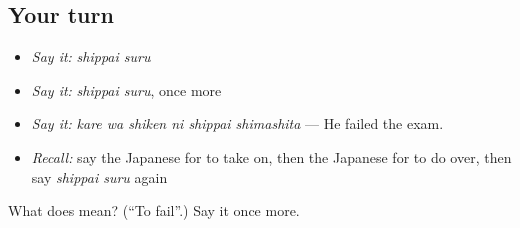 \subsection*{Your turn}
\begin{itemize}
\raggedright
  \item \emph{Say it:} \emph{shippai suru}
  \item \emph{Say it:} \emph{shippai suru}, once more
  \item \emph{Say it:} \emph{kare wa shiken ni shippai shimashita} — He failed the exam.
  \item \emph{Recall:} say the Japanese for to take on, then the Japanese for to do over, then say \emph{shippai suru} again
\end{itemize}

\begin{tcolorbox}[breakable,colback=teal!4,colframe=teal!35!black,title={Before you move on}]
What does  mean? (\textquotedblleft{}To fail\textquotedblright{}.) Say it once more.
\end{tcolorbox}
